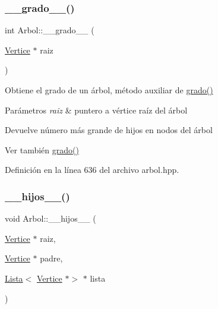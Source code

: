\subsubsection{\texorpdfstring{\+\_\+\+\_\+grado\+\_\+\+\_\+()}{\_\_grado\_\_()}}
{\footnotesize\ttfamily int Arbol\+::\+\_\+\+\_\+grado\+\_\+\+\_\+ (\begin{DoxyParamCaption}\item[{\hyperlink{classVertice}{Vertice} $\ast$}]{raiz }\end{DoxyParamCaption})\hspace{0.3cm}{\ttfamily [protected]}}



Obtiene el grado de un árbol, método auxiliar de \hyperlink{classArbol_a99e608849650b891c34852a81f93d4ab}{grado()} 


\begin{DoxyParams}{Parámetros}
{\em raiz} & puntero a vértice raíz del árbol \\
\hline
\end{DoxyParams}
\begin{DoxyReturn}{Devuelve}
número más grande de hijos en nodos del árbol 
\end{DoxyReturn}
\begin{DoxySeeAlso}{Ver también}
\hyperlink{classArbol_a99e608849650b891c34852a81f93d4ab}{grado()} 
\end{DoxySeeAlso}


Definición en la línea 636 del archivo arbol.\+hpp.

\mbox{\label{classArbol_a1e3da012e6667062976bca9f78efef7e}} 
\subsubsection{\texorpdfstring{\+\_\+\+\_\+hijos\+\_\+\+\_\+()}{\_\_hijos\_\_()}}
{\footnotesize\ttfamily void Arbol\+::\+\_\+\+\_\+hijos\+\_\+\+\_\+ (\begin{DoxyParamCaption}\item[{\hyperlink{classVertice}{Vertice} $\ast$}]{raiz,  }\item[{\hyperlink{classVertice}{Vertice} $\ast$}]{padre,  }\item[{\hyperlink{classLista}{Lista}$<$ \hyperlink{classVertice}{Vertice} $\ast$$>$ $\ast$}]{lista }\end{DoxyParamCaption})\hspace{0.3cm}{\ttfamily [protected]}}



